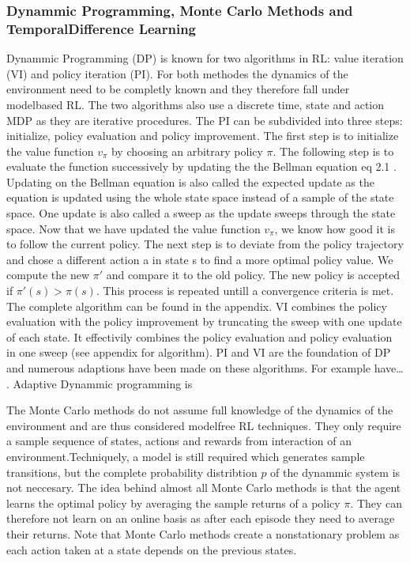 \documentclass[letterpaper,10pt,english]{jupyterBook}
\begin{document}
\subsubsection{Dynammic Programming, Monte Carlo Methods and Temporal\sphinxhyphen{}Difference Learning}
\label{\detokenize{Reinforcement_learning:dynammic-programming-monte-carlo-methods-and-temporal-difference-learning}}
\sphinxAtStartPar
Dynammic Programming (DP) is known for two algorithms in RL: value iteration (VI) and policy iteration (PI). For both methodes the dynamics of the environment need to be completly known and they therefore fall under model\sphinxhyphen{}based RL. The two algorithms also use a discrete time, state and action MDP as they are iterative procedures. The PI can be subdivided into three steps: initialize, policy evaluation and policy improvement. The first step is to initialize the value function \(v_{\pi}\) by choosing an arbitrary policy \(\pi\). The following step is to evaluate the function successively by updating the the Bellman equation eq 2.1 . Updating on the Bellman equation is also called the expected update as the equation is updated using the whole state space instead of a sample of the state space. One update is also called a sweep as the update sweeps through the state space. Now that we have updated the value function \(v_{\pi}\), we know how good it is to follow the current policy. The next step is to deviate from the policy trajectory and chose a different action a in state s to find a more optimal policy value. We compute the new \(\pi '\) and compare it to the old policy. The new policy is accepted if \(\pi '(s) > \pi(s)\). This process is repeated untill a convergence criteria is met. The complete algorithm can be found in the appendix. VI combines the policy evaluation with the policy improvement by truncating the sweep with one update of each state. It effectivily combines the policy evaluation and policy evaluation in one sweep (see appendix for algorithm). PI and VI are the foundation of DP and numerous adaptions have been made on these algorithms. For example have… . Adaptive Dynammic programming is

\sphinxAtStartPar
The Monte Carlo methods do not assume full knowledge of the dynamics of the environment and are thus considered model\sphinxhyphen{}free RL techniques. They only require a sample sequence of states, actions and rewards from interaction of an environment.Techniquely, a model is still required which generates sample transitions, but the complete probability distribtion \(p\) of the dynammic system is not neccesary. The idea behind almost all Monte Carlo methods is that the agent learns the optimal policy by averaging the sample returns of a policy \(\pi\). They can therefore not learn on an online basis as after each episode they need to average their returns. Note that Monte Carlo methods create a nonstationary problem as each action taken at a state depends on the previous states.
\end{document}
